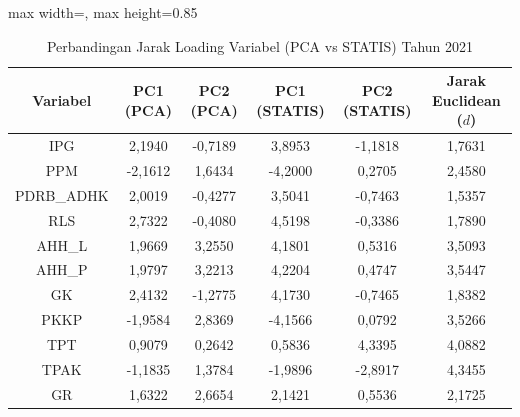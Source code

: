 \begin{table}[H]
\centering
\caption{Perbandingan Jarak Loading Variabel (PCA vs STATIS) Tahun 2021} \label{tab:app1jarak_loading_2021}
\begin{adjustbox}{max width=\textwidth, max height=0.85\textheight}
\begin{tabular}{|c|c|c|c|c|c|}
\hline
\textbf{Variabel} & \textbf{PC1 (PCA)} & \textbf{PC2 (PCA)} & \textbf{PC1 (STATIS)} & \textbf{PC2 (STATIS)} & \textbf{Jarak Euclidean ($d$)} \\
\hline
IPG & 2,1940 & -0,7189 & 3,8953 & -1,1818 & 1,7631 \\
PPM & -2,1612 & 1,6434 & -4,2000 & 0,2705 & 2,4580 \\
PDRB\_ADHK & 2,0019 & -0,4277 & 3,5041 & -0,7463 & 1,5357 \\
RLS & 2,7322 & -0,4080 & 4,5198 & -0,3386 & 1,7890 \\
AHH\_L & 1,9669 & 3,2550 & 4,1801 & 0,5316 & 3,5093 \\
AHH\_P & 1,9797 & 3,2213 & 4,2204 & 0,4747 & 3,5447 \\
GK & 2,4132 & -1,2775 & 4,1730 & -0,7465 & 1,8382 \\
PKKP & -1,9584 & 2,8369 & -4,1566 & 0,0792 & 3,5266 \\
TPT & 0,9079 & 0,2642 & 0,5836 & 4,3395 & 4,0882 \\
TPAK & -1,1835 & 1,3784 & -1,9896 & -2,8917 & 4,3455 \\
GR & 1,6322 & 2,6654 & 2,1421 & 0,5536 & 2,1725 \\
\hline
\end{tabular}
\end{adjustbox}
\end{table}